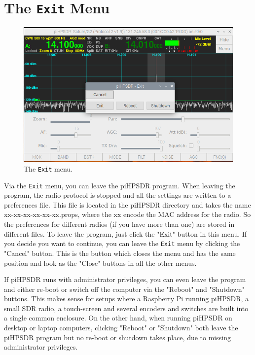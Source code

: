 \documentclass[12pt]{book}
\def\bltt#1{\texttt{\color{blue}#1}}
\begin{document}
\section{The \texttt{Exit} Menu}

\begin{figure}[ht]
\center
\includegraphics[width=12cm]{ExitMenu.png}
\caption{The \bltt{Exit} menu.}
\end{figure}

Via the \bltt{Exit} menu, you can leave the piHPSDR program. When leaving the program,
the radio protocol is stopped and all the settings are written to a preferences file. This
file is located in the piHPSDR directory and takes the name xx-xx-xx-xx-xx-xx.props, where
the xx encode the MAC address for the radio. So the preferences for different radios (if you
have more than one) are stored in different files. To leave the program, just click the
"Exit" button in this menu. If you decide you want to continue, you can leave the \bltt{Exit}
menu by clicking the "Cancel" button. This is the button which closes the menu and has
the same position and look as the "Close" buttons in all the other menus.

If piHPSDR runs with administrator privileges, you can even leave the program and either re-boot
or switch off the computer via the "Reboot" and "Shutdown" buttons. This makes sense for setups
where a Raspberry Pi running piHPSDR, a small SDR radio, a touch-screen and several encoders
and switches are built into a single common enclosure. On the other hand, when running
piHPSDR on desktop or laptop computers, clicking "Reboot" or "Shutdown" both leave the piHPSDR
program but no re-boot or shutdown takes place, due to missing administrator privileges.
\end{document}
